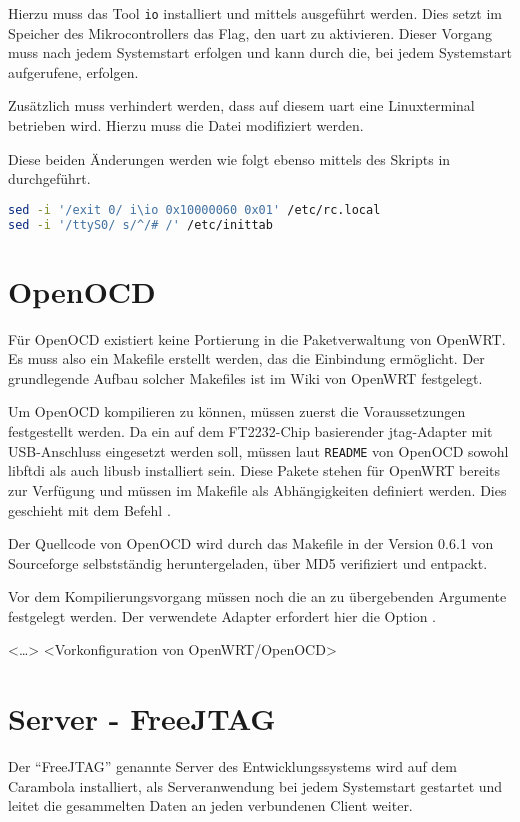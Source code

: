 Hierzu muss das Tool \texttt{io} installiert und mittels 
 ausgeführt werden. Dies setzt im Speicher des
Mikrocontrollers das Flag, den \gls{uart} zu aktivieren. Dieser Vorgang muss
nach jedem Systemstart erfolgen und kann durch die, bei jedem Systemstart
aufgerufene,  erfolgen.

Zusätzlich muss verhindert werden, dass auf diesem \gls{uart} eine Linuxterminal
betrieben wird. Hierzu muss die Datei  modifiziert
werden.

Diese beiden Änderungen werden wie folgt ebenso mittels des Skripts in
 durchgeführt.
\begin{lstlisting}[language=sh]
sed -i '/exit 0/ i\io 0x10000060 0x01' /etc/rc.local
sed -i '/ttyS0/ s/^/# /' /etc/inittab
\end{lstlisting}

\section{OpenOCD}
Für OpenOCD existiert keine Portierung in die Paketverwaltung von OpenWRT. Es
muss also ein Makefile erstellt werden, das die Einbindung ermöglicht. Der
grundlegende Aufbau solcher Makefiles ist im Wiki von OpenWRT
festgelegt\cite{OWRT}.

Um OpenOCD kompilieren zu können, müssen zuerst die Voraussetzungen festgestellt
werden. Da ein auf dem FT2232-Chip basierender \gls{jtag}-Adapter mit
USB-Anschluss eingesetzt werden soll, müssen laut \texttt{README} von OpenOCD
sowohl libftdi als auch libusb installiert sein. Diese Pakete stehen für OpenWRT
bereits zur Verfügung und müssen im Makefile als Abhängigkeiten definiert
werden. Dies geschieht mit dem Befehl .

Der Quellcode von OpenOCD wird durch das Makefile in der Version 0.6.1 von
Sourceforge selbstständig heruntergeladen, über MD5 verifiziert und entpackt.

Vor dem Kompilierungsvorgang müssen noch die an 
zu übergebenden Argumente festgelegt werden. Der verwendete Adapter erfordert
hier die Option .

<\ldots>
<Vorkonfiguration von OpenWRT/OpenOCD>
\section{Server - FreeJTAG}
Der "`FreeJTAG"' genannte Server des Entwicklungssystems wird auf dem Carambola
installiert, als Serveranwendung bei jedem Systemstart gestartet und leitet die
gesammelten Daten an jeden verbundenen Client weiter.

